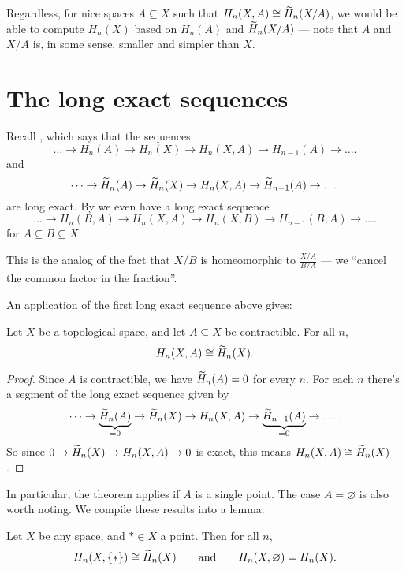 Regardless, for nice spaces $A \subseteq X$ such that $H_n(X, A) \cong \widetilde H_n(X/A)$, we would be
able to compute $H_n(X)$ based on $H_n(A)$ and $\widetilde H_n(X/A)$ --- note that $A$ and $X/A$ is, in
some sense, smaller and simpler than $X$.

\section{The long exact sequences}
Recall , which says that the sequences
\[ \dots \to H_n(A) \to H_n(X) \to H_n(X,A) \to H_{n-1}(A) \to \dots. \]
and
\[ \dots \to \widetilde H_n(A) \to \widetilde H_n(X) \to H_n(X,A) \to \widetilde H_{n-1}(A) \to \dots \]
are long exact.
By  we even have a long exact sequence
\[
	\dots
	\to H_n(B,A)
	\to H_n(X,A)
	\to H_n(X,B)
	\to H_{n-1}(B,A)
	\to \dots.
\]
for $A \subseteq B \subseteq X$.

\begin{moral}
	This is the analog of the fact that $X/B$ is homeomorphic to $\frac{X/A}{B/A}$ --- we ``cancel
	the common factor in the fraction''.
\end{moral}

An application of the first long exact sequence above gives:
\begin{lemma}
	\label{lem:rel_contractible}
	Let $X$ be a topological space,
	and let $A \subseteq X$ be contractible.
	For all $n$, \[ H_n(X, A) \cong \widetilde H_n(X). \]
\end{lemma}
\begin{proof}
	Since $A$ is contractible, we have $\widetilde H_n(A) = 0$ for every $n$.
	For each $n$ there's a segment of the long exact sequence given by
	\[ \dots \to \underbrace{\widetilde H_n(A)}_{=0} \to \widetilde H_n(X) \to H_n(X,A)
	\to \underbrace{\widetilde H_{n-1}(A)}_{=0} \to \dots. \]
	So since $0 \to \widetilde H_n(X) \to H_n(X,A) \to 0$ is exact,
	this means $H_n(X,A) \cong \widetilde H_n(X)$.
\end{proof}

In particular, the theorem applies if $A$ is a single point.
The case $A = \varnothing$ is also worth noting.
We compile these results into a lemma:
\begin{lemma}
	Let $X$ be any space, and $\ast \in X$ a point. Then for all $n$,
	\[
		H_n(X, \{\ast\}) \cong \widetilde H_n(X)
		\qquad\text{and}\qquad
		H_n(X, \varnothing) = H_n(X).
	\]
\end{lemma}

